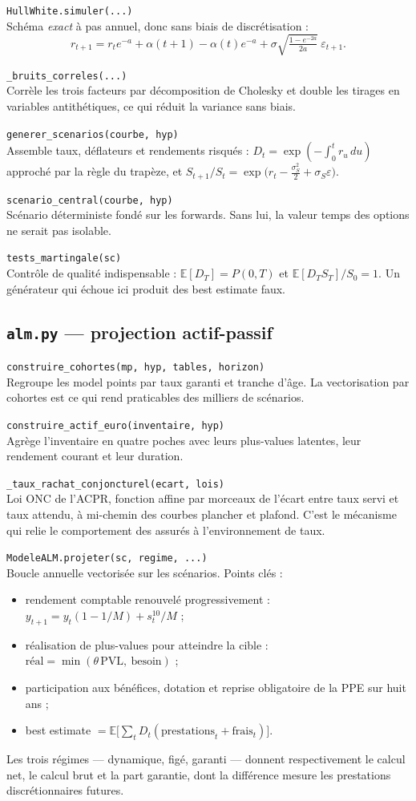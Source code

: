 \documentclass[10pt,a4paper]{article}
\newcommand{\fn}[2]{\par\smallskip\textcolor{bleufonce}{\texttt{#1}}\\ #2\par}
\begin{document}
\fn{HullWhite.simuler(...)}{Schéma \emph{exact} à pas annuel, donc sans biais de discrétisation :
\[
r_{t+1} = r_t e^{-a} + \alpha(t+1) - \alpha(t)e^{-a}
+ \sigma\sqrt{\tfrac{1-e^{-2a}}{2a}}\ \varepsilon_{t+1}.
\]}

\fn{\_bruits\_correles(...)}{Corrèle les trois facteurs par décomposition de Cholesky et double
les tirages en variables antithétiques, ce qui réduit la variance sans biais.}

\fn{generer\_scenarios(courbe, hyp)}{Assemble taux, déflateurs et rendements risqués :
$D_t = \exp(-\int_0^t r_u\,du)$ approché par la règle du trapèze, et
$S_{t+1}/S_t = \exp\bigl(r_t - \frac{\sigma_S^2}{2} + \sigma_S \varepsilon\bigr)$.}

\fn{scenario\_central(courbe, hyp)}{Scénario déterministe fondé sur les forwards. Sans lui, la
valeur temps des options ne serait pas isolable.}

\fn{tests\_martingale(sc)}{Contrôle de qualité indispensable : $\mathbb{E}[D_T] = P(0,T)$ et
$\mathbb{E}[D_T S_T]/S_0 = 1$. Un générateur qui échoue ici produit des best estimate faux.}

\subsection{\texttt{alm.py} — projection actif-passif}

\fn{construire\_cohortes(mp, hyp, tables, horizon)}{Regroupe les model points par taux garanti et
tranche d'âge. La vectorisation par cohortes est ce qui rend praticables des milliers de
scénarios.}

\fn{construire\_actif\_euro(inventaire, hyp)}{Agrège l'inventaire en quatre poches avec leurs
plus-values latentes, leur rendement courant et leur duration.}

\fn{\_taux\_rachat\_conjoncturel(ecart, lois)}{Loi ONC de l'ACPR, fonction affine par morceaux de
l'écart entre taux servi et taux attendu, à mi-chemin des courbes plancher et plafond. C'est le
mécanisme qui relie le comportement des assurés à l'environnement de taux.}

\fn{ModeleALM.projeter(sc, regime, ...)}{Boucle annuelle vectorisée sur les scénarios. Points
clés :
\begin{itemize}
\item rendement comptable renouvelé progressivement :
      $y_{t+1} = y_t(1-1/M) + s^{10}_t / M$ ;
\item réalisation de plus-values pour atteindre la cible :
      $\text{réal} = \min(\theta\,\mathrm{PVL},\ \text{besoin})$ ;
\item participation aux bénéfices, dotation et reprise obligatoire de la PPE sur huit ans ;
\item best estimate $= \mathbb{E}\bigl[\sum_t D_t (\text{prestations}_t + \text{frais}_t)\bigr]$.
\end{itemize}
Les trois régimes — dynamique, figé, garanti — donnent respectivement le calcul net, le calcul
brut et la part garantie, dont la différence mesure les prestations discrétionnaires futures.}
\end{document}
